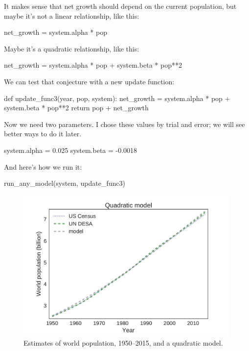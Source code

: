 \documentclass[12pt]{book}
\theoremstyle{exercise}
\begin{document}
It makes sense that net growth should depend on the current population, but maybe it's not a linear relationship, like this:

\begin{python}
    net_growth = system.alpha * pop
\end{python}

Maybe it's a quadratic relationship, like this:

\begin{python}
    net_growth = system.alpha * pop + system.beta * pop**2
\end{python}

We can test that conjecture with a new update function:

\begin{python}
def update_func3(year, pop, system):
    net_growth = system.alpha * pop + system.beta * pop**2
    return pop + net_growth
\end{python}

Now we need two parameters.  I chose these values by trial and error; we will see better ways to do it later.

\begin{python}
system.alpha = 0.025
system.beta = -0.0018
\end{python}

And here's how we run it:

\begin{python}
run_any_model(system, update_func3)
\end{python}

\begin{figure}
\centerline{\includegraphics[height=3in]{figs/chap03-fig04.pdf}}
\caption{Estimates of world population, 1950--2015, and a quadratic model.}
\label{chap03-fig04}
\end{figure}
\end{document}

